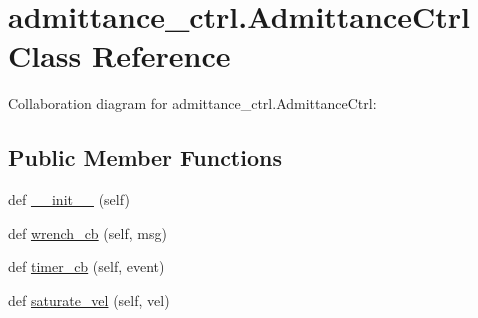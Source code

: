 \hypertarget{classadmittance__ctrl_1_1_admittance_ctrl}{}\section{admittance\+\_\+ctrl.\+Admittance\+Ctrl Class Reference}
\label{classadmittance__ctrl_1_1_admittance_ctrl}


Collaboration diagram for admittance\+\_\+ctrl.\+Admittance\+Ctrl\+:
\subsection*{Public Member Functions}
\begin{DoxyCompactItemize}
\item 
def \hyperlink{classadmittance__ctrl_1_1_admittance_ctrl_a6e303b642da1e5fe2c9a3a29a148dbb9}{\+\_\+\+\_\+init\+\_\+\+\_\+} (self)
\item 
def \hyperlink{classadmittance__ctrl_1_1_admittance_ctrl_a26b129bab2045988a9de094fbc7b582d}{wrench\+\_\+cb} (self, msg)
\item 
def \hyperlink{classadmittance__ctrl_1_1_admittance_ctrl_a38c53c8d924147104986363e8bd630f7}{timer\+\_\+cb} (self, event)
\item 
def \hyperlink{classadmittance__ctrl_1_1_admittance_ctrl_a7191d1d7f805fbeef6a0a0667bd0ac65}{saturate\+\_\+vel} (self, vel)
\end{DoxyCompactItemize}
